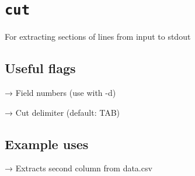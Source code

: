     
    
    

    
    \section{\texorpdfstring{\texttt{cut}}{cut}}\label{cut}

For extracting sections of lines from input to stdout

    \subsection{Useful flags}\label{useful-flags}

\begin{Shaded}
\begin{Highlighting}[]
 
\end{Highlighting}
\end{Shaded}

→ Field numbers (use with -d)

\begin{Shaded}
\begin{Highlighting}[]
 
\end{Highlighting}
\end{Shaded}

→ Cut delimiter (default: TAB)

    \subsection{Example uses}\label{example-uses}

\begin{Shaded}
\begin{Highlighting}[]
 \StringTok{\textquotesingle{},\textquotesingle{}} 
\end{Highlighting}
\end{Shaded}

→ Extracts second column from data.csv

    \begin{Shaded}
\begin{Highlighting}[]
 \StringTok{\textquotesingle{},\textquotesingle{}} 
\end{Highlighting}
\end{Shaded}

